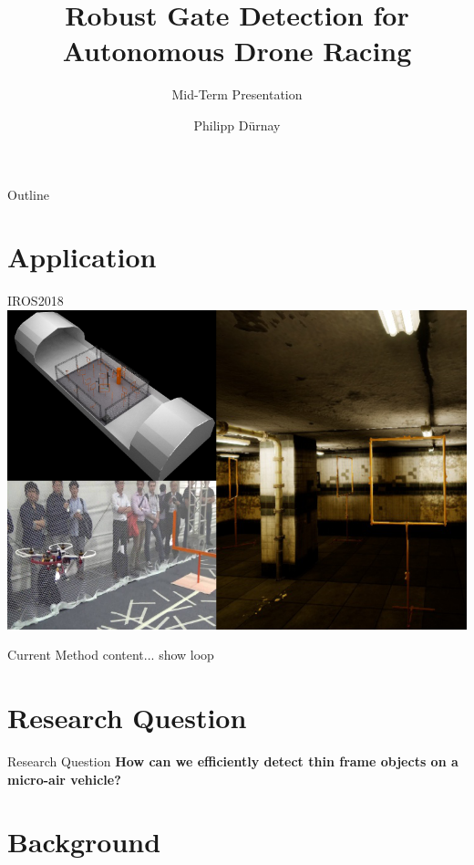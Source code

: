 \documentclass{beamer}
\title{Robust Gate Detection for Autonomous Drone Racing} %
\subtitle{Mid-Term Presentation} %
\author{Philipp Dürnay}
\begin{document}
  \frame{\maketitle}


  \begin{darkframes}
  	\begin{frame}{Outline}
  		\tableofcontents
  	\end{frame}
	\section{Application}
    \begin{frame}{IROS2018}
    	\includegraphics[width=\textwidth]{fig/application}
    \end{frame}
    \begin{frame}{Current Method}
       	content...
       	show loop
    \end{frame}

	\section{Research Question}    
	\begin{frame}{Research Question}
	\textbf{How can we efficiently detect thin frame objects on a micro-air vehicle?}
	\end{frame}
    \section{Background}


\end{darkframes}
\end{document}
